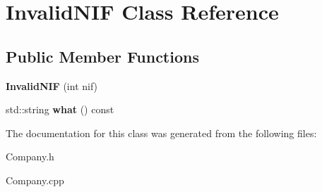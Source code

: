 \hypertarget{class_invalid_n_i_f}{}\section{Invalid\+N\+IF Class Reference}
\label{class_invalid_n_i_f}
\subsection*{Public Member Functions}
\begin{DoxyCompactItemize}
\item 
\mbox{\label{class_invalid_n_i_f_a4f872703f283216c822fed2ea52ea3b5}} 
{\bfseries Invalid\+N\+IF} (int nif)
\item 
\mbox{\label{class_invalid_n_i_f_aa68eefbe2a75cd3ce2cba466bf3d1dcf}} 
std\+::string {\bfseries what} () const
\end{DoxyCompactItemize}


The documentation for this class was generated from the following files\+:\begin{DoxyCompactItemize}
\item 
Company.\+h\item 
Company.\+cpp\end{DoxyCompactItemize}
